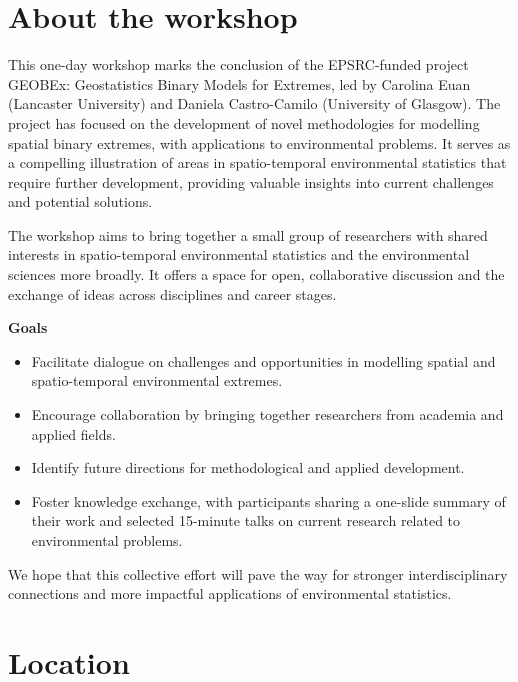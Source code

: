 \documentclass[
  11pt,
  letterpaper,
  DIV=11,
  numbers=noendperiod]{scrartcl}
\renewcommand*\contentsname{Table of contents}
\newcommand\contentsname{Table of contents}
\begin{document}
\renewcommand*\contentsname{Table of contents}
{
\hypersetup{linkcolor=}
\setcounter{tocdepth}{3}
\tableofcontents
}

\newpage

\section{About the workshop}\label{about-the-workshop}

This one-day workshop marks the conclusion of the EPSRC-funded project
GEOBEx: Geostatistics Binary Models for Extremes, led by Carolina Euan
(Lancaster University) and Daniela Castro-Camilo (University of
Glasgow). The project has focused on the development of novel
methodologies for modelling spatial binary extremes, with applications
to environmental problems. It serves as a compelling illustration of
areas in spatio-temporal environmental statistics that require further
development, providing valuable insights into current challenges and
potential solutions.

The workshop aims to bring together a small group of researchers with
shared interests in spatio-temporal environmental statistics and the
environmental sciences more broadly. It offers a space for open,
collaborative discussion and the exchange of ideas across disciplines
and career stages.

\textbf{Goals}

\begin{itemize}
\item
  Facilitate dialogue on challenges and opportunities in modelling
  spatial and spatio-temporal environmental extremes.
\item
  Encourage collaboration by bringing together researchers from academia
  and applied fields.
\item
  Identify future directions for methodological and applied development.
\item
  Foster knowledge exchange, with participants sharing a one-slide
  summary of their work and selected 15-minute talks on current research
  related to environmental problems.
\end{itemize}

We hope that this collective effort will pave the way for stronger
interdisciplinary connections and more impactful applications of
environmental statistics.

\newpage

\section{Location}\label{location}
\end{document}
